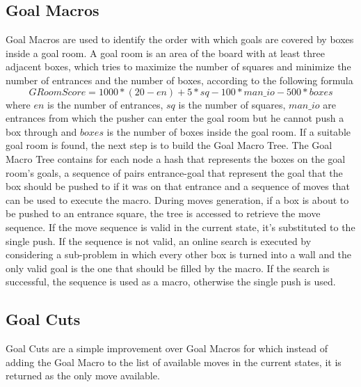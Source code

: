 \subsection{Goal Macros}
Goal Macros are used to identify the order with which goals are covered by boxes inside a goal room. A goal room is an area of the board with at least three adjacent boxes, which tries to maximize the number of squares and minimize the number of entrances and the number of boxes, according to the following formula
\begin{equation}
    GRoomScore = 1000*(20-en)+5*sq- 100*man\_io- 500*boxes
\end{equation}
where $en$ is the number of entrances, $sq$ is the number of squares, $man\_io$ are entrances from which the pusher can enter the goal room but he cannot push a box through and $boxes$ is the number of boxes inside the goal room. If a suitable goal room is found, the next step is to build the Goal Macro Tree. The Goal Macro Tree contains for each node a hash that represents the boxes on the goal room's goals, a sequence of pairs entrance-goal that represent the goal that the box should be pushed to if it was on that entrance and a sequence of moves that can be used to execute the macro. During moves generation, if a box is about to be pushed to an entrance square, the tree is accessed to retrieve the move sequence. If the move sequence is valid in the current state, it's substituted to the single push. If the sequence is not valid, an online search is executed by considering a sub-problem in which every other box is turned into a wall and the only valid goal is the one that should be filled by the macro. If the search is successful, the sequence is used as a macro, otherwise the single push is used.

\subsection{Goal Cuts}
Goal Cuts are a simple improvement over Goal Macros for which instead of adding the Goal Macro to the list of available moves in the current states, it is returned as the only move available.